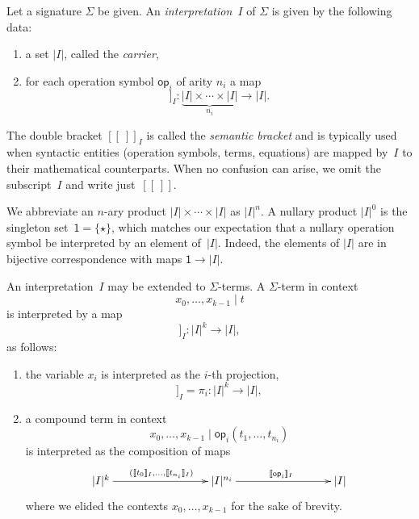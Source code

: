 \documentclass{amsart}
\newcommand{\op}{\mathsf{op}}
\newcommand{\one}{\mathsf{1}}
\newcommand{\sem}[1]{[\![#1]\!]}
\begin{document}
Let a signature $\Sigma$ be given. An \emph{interpretation~$I$} of $\Sigma$ is given by
the following data:
%
\begin{enumerate}
\item a set $|I|$, called the \emph{carrier},
\item for each operation symbol $\op_i$ of arity $n_i$ a map
  \begin{equation*}
    \sem{\op_i}_I : \underbrace{|I| \times \cdots \times |I|}_{n_i} \to |I|.
  \end{equation*}
\end{enumerate}
%
The double bracket $\sem{{\ }}_I$ is called the \emph{semantic bracket} and is typically
used when syntactic entities (operation symbols, terms, equations) are mapped by~$I$ to
their mathematical counterparts. When no confusion can arise, we omit the subscript~$I$
and write just~$\sem{{\ }}$.

We abbreviate an $n$-ary product $|I| \times \cdots \times |I|$ as $|I|^n$. A nullary product
$|I|^0$ is the singleton set~$\one = \{\star\}$, which matches our expectation that a
nullary operation symbol be interpreted by an element of~$|I|$. Indeed, the elements of $|I|$
are in bijective correspondence with maps $\one \to |I|$.

An interpretation~$I$ may be extended to $\Sigma$-terms. A $\Sigma$-term in context
%
\begin{equation*}
  x_0, \ldots, x_{k-1} \mid t
\end{equation*}
%
is interpreted by a map
%
\begin{equation*}
  \sem{x_0, \ldots, x_{k-1} \mid t}_I : |I|^k \to |I|,
\end{equation*}
%
as follows:
%
\begin{enumerate}
\item the variable $x_i$ is interpreted as the $i$-th projection,
  \begin{equation*}
    \sem{x_0, \ldots, x_{k-1} \mid  x_i}_I = \pi_i : |I|^k \to |I|,
  \end{equation*}
\item a compound term in context
  \begin{equation*}
    x_0, \ldots, x_{k-1} \mid \op_i(t_1, \ldots, t_{n_i})
  \end{equation*}
  is interpreted as the composition of maps
  \begin{equation*}
    \xymatrix@+6em{
      {|I|^k} \ar[r]^{(\sem{t_0}_I, \ldots, \sem{t_{n_i}}_I)}
      &
      {|I|^{n_i}} \ar[r]^{\sem{\op_i}_I}
      &
      {|I|}
    }
  \end{equation*}
  where we elided the contexts $x_0, \ldots, x_{k-1}$ for the sake of brevity.
\end{enumerate}
\end{document}
